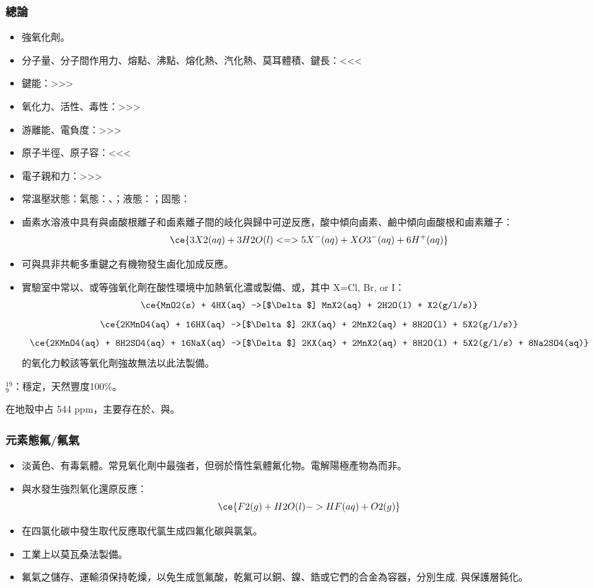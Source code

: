 \documentclass[a4paper,12pt]{report}
\begin{document}
\subsubsection{總論}
\begin{itemize}
\item 強氧化劑。
\item 分子量、分子間作用力、熔點、沸點、熔化熱、汽化熱、莫耳體積、鍵長：<<<
\item 鍵能：>>>
\item 氧化力、活性、毒性：>>>
\item 游離能、電負度：>>>
\item 原子半徑、原子容：<<<
\item 電子親和力：>>>
\item 常溫壓狀態：氣態：、；液態：；固態：
\item 鹵素水溶液中具有與鹵酸根離子和鹵素離子間的岐化與歸中可逆反應，酸中傾向鹵素、鹼中傾向鹵酸根和鹵素離子：
\[\ce{3X2(aq) + 3H2O(l) <=> 5X^-(aq) + XO3^-(aq) + 6H^+(aq)}\]
\item 可與具非共軛多重鍵之有機物發生鹵化加成反應。
\item 實驗室中常以、或等強氧化劑在酸性環境中加熱氧化濃或製備、或，其中 X=Cl, Br, or I：
\[\ce{MnO2(s) + 4HX(aq) ->[$\Delta$] MnX2(aq) + 2H2O(l) + X2(g/l/s)}\]
\[\ce{2KMnO4(aq) + 16HX(aq) ->[$\Delta$] 2KX(aq) + 2MnX2(aq) + 8H2O(l) + 5X2(g/l/s)}\]
\[\ce{2KMnO4(aq) + 8H2SO4(aq) + 16NaX(aq) ->[$\Delta$] 2KX(aq) + 2MnX2(aq) + 8H2O(l) + 5X2(g/l/s) + 8Na2SO4(aq)}\]
的氧化力較該等氧化劑強故無法以此法製備。
\end{itemize}
\bit
\item $^{19}_9$\rmF：穩定，天然豐度100\%。
\item 在地殼中占 544 ppm，主要存在於、與。
\eit
\subsubsection{元素態氟/氟氣}
\begin{itemize}
\item 淡黃色、有毒氣體。常見氧化劑中最強者，但弱於惰性氣體氟化物。電解陽極產物為而非。
\item 與水發生強烈氧化還原反應：
\[\ce{F2(g) + H2O(l) -> HF(aq) + O2(g)}\]
\item 在四氯化碳中發生取代反應取代氯生成四氟化碳與氯氣。
\item 工業上以莫瓦桑法製備。
\item 氟氣之儲存、運輸須保持乾燥，以免生成氫氟酸，乾氟可以銅、鎳、鋯或它們的合金為容器，分別生成, 與保護層鈍化。
\end{itemize}
\end{document}
